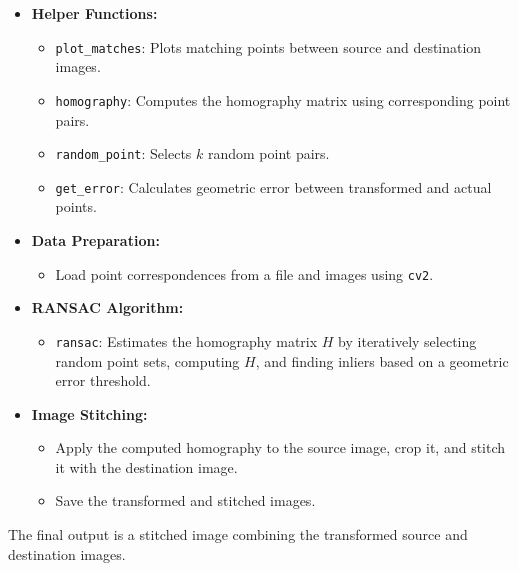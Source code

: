 \documentclass{article}
\begin{document}
\begin{itemize}

    \item \textbf{Helper Functions:}
    \begin{itemize}
        \item \texttt{plot\_matches}: Plots matching points between source and destination images.
        \item \texttt{homography}: Computes the homography matrix using corresponding point pairs.
        \item \texttt{random\_point}: Selects $k$ random point pairs.
        \item \texttt{get\_error}: Calculates geometric error between transformed and actual points.
    \end{itemize}

    \item \textbf{Data Preparation:}
    \begin{itemize}
        \item Load point correspondences from a file and images using \texttt{cv2}.
    \end{itemize}

    \item \textbf{RANSAC Algorithm:}
    \begin{itemize}
        \item \texttt{ransac}: Estimates the homography matrix $H$ by iteratively selecting random point sets, computing $H$, and finding inliers based on a geometric error threshold.
    \end{itemize}

    \item \textbf{Image Stitching:}
    \begin{itemize}
        \item Apply the computed homography to the source image, crop it, and stitch it with the destination image.
        \item Save the transformed and stitched images.
    \end{itemize}
\end{itemize}

The final output is a stitched image combining the transformed source and destination images.
\end{document}
